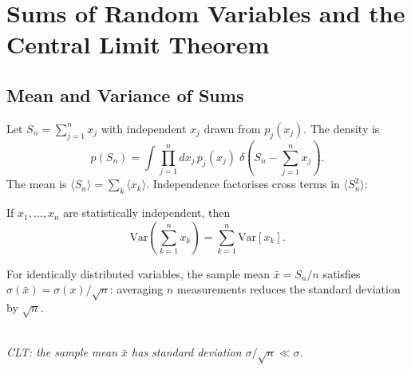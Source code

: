 \section{Sums of Random Variables and the Central Limit Theorem}

\subsection{Mean and Variance of Sums}

Let $S_n = \sum_{j=1}^{n} x_j$ with independent $x_j$ drawn from $p_j(x_j)$. The density is
\begin{equation}
    p(S_n) = \int \prod_{j=1}^{n} dx_j\, p_j(x_j)\; \delta\!\left(S_n - \sum_{j=1}^{n} x_j\right). \label{eq:sum_dist}
\end{equation}
The mean is $\langle S_n\rangle = \sum_{k}\langle x_k\rangle$. Independence factorises cross terms in $\langle S_n^2\rangle$:

\begin{theorem}
If $x_1, \ldots, x_n$ are statistically independent, then
\begin{equation}
    \mathrm{Var}\!\left(\sum_{k=1}^{n} x_k\right) = \sum_{k=1}^{n} \mathrm{Var}[x_k].
\end{equation}
\end{theorem}
For identically distributed variables, the sample mean $\bar{x} = S_n/n$ satisfies $\sigma(\bar{x}) = \sigma(x)/\sqrt{n}$: averaging $n$ measurements reduces the standard deviation by $\sqrt{n}$.

\begin{center}
\\[3pt]
{\small\itshape CLT: the sample mean $\bar{x}$ has standard deviation $\sigma/\sqrt{n}\ll\sigma$.}
\end{center}

